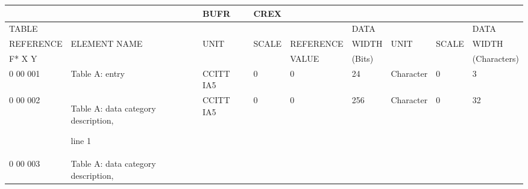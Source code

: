 \begin{longtable}[]{@{}lllllllll@{}}
\toprule
& & BUFR & CREX & & & & &\tabularnewline
\midrule
\endhead
TABLE & & & & & DATA & & & DATA\tabularnewline
REFERENCE & ELEMENT NAME & UNIT & SCALE & REFERENCE & WIDTH & UNIT & SCALE & WIDTH\tabularnewline
F* X Y & & & & VALUE & (Bits) & & & (Characters)\tabularnewline
0 00 001 & Table A: entry & CCITT IA5 & 0 & 0 & 24 & Character & 0 & 3\tabularnewline
\begin{minipage}[t]{0.08\columnwidth}\raggedright
0 00 002\strut
\end{minipage} & \begin{minipage}[t]{0.08\columnwidth}\raggedright
Table A: data category description,

line 1\strut
\end{minipage} & \begin{minipage}[t]{0.08\columnwidth}\raggedright
CCITT IA5\strut
\end{minipage} & \begin{minipage}[t]{0.08\columnwidth}\raggedright
0\strut
\end{minipage} & \begin{minipage}[t]{0.08\columnwidth}\raggedright
0\strut
\end{minipage} & \begin{minipage}[t]{0.08\columnwidth}\raggedright
256\strut
\end{minipage} & \begin{minipage}[t]{0.08\columnwidth}\raggedright
Character\strut
\end{minipage} & \begin{minipage}[t]{0.08\columnwidth}\raggedright
0\strut
\end{minipage} & \begin{minipage}[t]{0.08\columnwidth}\raggedright
32\strut
\end{minipage}\tabularnewline
\begin{minipage}[t]{0.08\columnwidth}\raggedright
0 00 003\strut
\end{minipage} & \begin{minipage}[t]{0.08\columnwidth}\raggedright
Table A: data category description,


\end{minipage}
\end{longtable}
